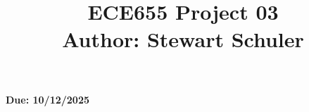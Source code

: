 \documentclass[a4paper,12pt]{article}
\begin{document}
 \title{ECE655 Project 03\\
                \vspace{4pt}
                \small{Author: Stewart Schuler}
                \vspace{-12pt}}
 \date{}
 \maketitle
 \begin{center}
 \textbf{Due: 10/12/2025}
 \end{center}

\tableofcontents







\end{document}
